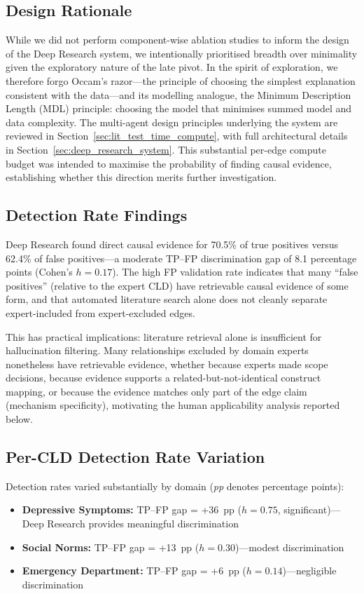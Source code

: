\subsection{Design Rationale}

While we did not perform component-wise ablation studies to inform the design of the Deep Research system, we intentionally prioritised breadth over minimality given the exploratory nature of the late pivot. In the spirit of exploration, we therefore forgo Occam's razor---the principle of choosing the simplest explanation consistent with the data---and its modelling analogue, the Minimum Description Length (MDL) principle: choosing the model that minimises summed model and data complexity. The multi-agent design principles underlying the system are reviewed in Section~\ref{sec:lit_test_time_compute}, with full architectural details in Section~\ref{sec:deep_research_system}. This substantial per-edge compute budget was intended to maximise the probability of finding causal evidence, establishing whether this direction merits further investigation.

\subsection{Detection Rate Findings}

Deep Research found direct causal evidence for 70.5\% of true positives versus 62.4\% of false positives---a moderate TP--FP discrimination gap of 8.1 percentage points (Cohen's $h=0.17$). The high FP validation rate indicates that many ``false positives'' (relative to the expert CLD) have retrievable causal evidence of some form, and that automated literature search alone does not cleanly separate expert-included from expert-excluded edges.

This has practical implications: literature retrieval alone is insufficient for hallucination filtering. Many relationships excluded by domain experts nonetheless have retrievable evidence, whether because experts made scope decisions, because evidence supports a related-but-not-identical construct mapping, or because the evidence matches only part of the edge claim (mechanism specificity), motivating the human applicability analysis reported below.

\subsection{Per-CLD Detection Rate Variation}

Detection rates varied substantially by domain (\textit{pp} denotes percentage points):
\begin{itemize}[noitemsep]
    \item \textbf{Depressive Symptoms:} TP--FP gap = +36~pp ($h=0.75$, significant)---Deep Research provides meaningful discrimination
    \item \textbf{Social Norms:} TP--FP gap = +13~pp ($h=0.30$)---modest discrimination
    \item \textbf{Emergency Department:} TP--FP gap = +6~pp ($h=0.14$)---negligible discrimination
\end{itemize}

